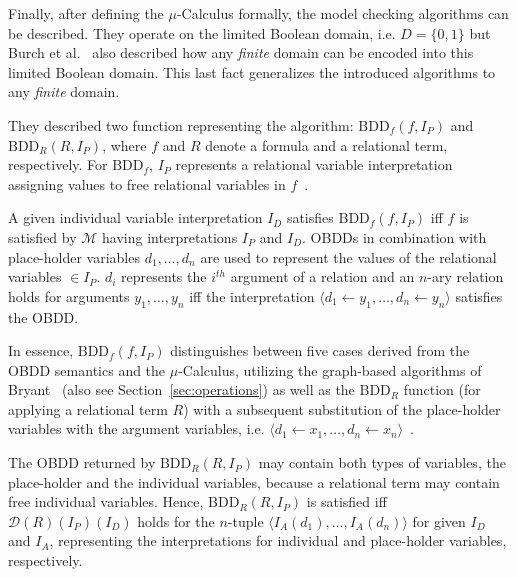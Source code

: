 \documentclass{vldb}
\begin{document}
Finally, after defining the $\mu$-Calculus formally, the model checking algorithms
can be described. They operate on the limited Boolean domain, i.e.
$D = \lbrace 0, 1 \rbrace$ but Burch et al.~\cite{BURCH90} also described how any
\textit{finite} domain can be encoded into this limited Boolean domain. This last
fact generalizes the introduced algorithms to any \textit{finite} domain.

They described two function representing the algorithm:
$\text{BDD}_f \left( f, I_P \right)$ and $\text{BDD}_R \left( R, I_P \right)$,
where $f$ and $R$ denote a formula and a relational term, respectively. For 
$\text{BDD}_f$, $I_P$ represents a relational variable interpretation assigning
values to free relational variables in $f$~\cite{BURCH90}.

A given individual variable interpretation $I_D$ satisfies \newline
$\text{BDD}_f \left( f, I_P \right)$ iff $f$ is satisfied by $\mathcal{M}$ having
interpretations $I_P$ and $I_D$. OBDDs in combination with place-holder variables
$d_1, \ldots, d_n$ are used to represent the values of the relational variables
$\in I_P$. $d_i$ represents the $i^{th}$ argument of a relation and an $n$-ary
relation holds for arguments $y_1, \ldots, y_n$ iff the interpretation
$\langle d_1 \leftarrow y_1, \ldots, d_n \leftarrow y_n \rangle$ satisfies the
OBDD.

In essence, $\text{BDD}_f \left( f, I_P \right)$ distinguishes between five cases
derived from the OBDD semantics and the $\mu$-Calculus, utilizing the graph-based
algorithms of Bryant~\cite{BRYANT86} (also see Section~\ref{sec:operations}) as
well as the $\text{BDD}_R$ function (for applying a relational term $R$) with a
subsequent substitution of the place-holder variables with the argument variables, 
i.e. \newline
$\langle d_1 \leftarrow x_1, \ldots, d_n \leftarrow x_n \rangle$~\cite{BURCH90}.

The OBDD returned by $\text{BDD}_R \left( R, I_P \right)$ may contain both types
of variables, the place-holder and the individual variables, because a relational
term may contain free individual variables. Hence,
$\text{BDD}_R \left( R, I_P \right)$ is satisfied iff
$\mathcal{D} \left( R \right) \left( I_P \right) \left( I_D \right)$ holds for
the $n$-tuple $\langle I_A \left( d_1 \right), \ldots, I_A \left( d_n \right) \rangle$
for given $I_D$ and $I_A$, representing the interpretations for individual and
place-holder variables, respectively. 
\end{document}
